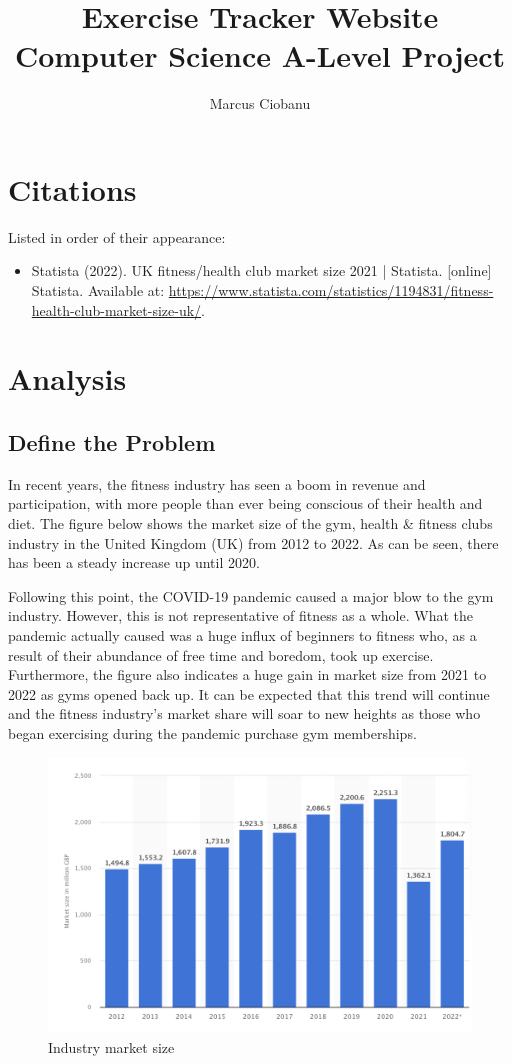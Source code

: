 \documentclass{article}
\title{Exercise Tracker Website \\ \vspace{10pt} \large Computer Science A-Level Project \normalsize}
\author{Marcus Ciobanu}
\date{}
\begin{document}
\maketitle
\newpage

\tableofcontents
\newpage

\section{Citations}
Listed in order of their appearance:
\begin{itemize}
  \item Statista (2022). UK fitness/health club market size 2021 | Statista. [online] Statista. Available at: \url{https://www.statista.com/statistics/1194831/fitness-health-club-market-size-uk/}.
\end{itemize}
\newpage

\section{Analysis}

\subsection{Define the Problem}
In recent years, the fitness industry has seen a boom in revenue and participation, with more people than ever being conscious of their health and diet. The figure below shows the market size of the gym, health \& fitness clubs industry in the United Kingdom (UK) from 2012 to 2022. As can be seen, there has been a steady increase up until 2020. 

Following this point, the COVID-19 pandemic caused a major blow to the gym industry. However, this is not representative of fitness as a whole. What the pandemic actually caused was a huge influx of beginners to fitness who, as a result of their abundance of free time and boredom, took up exercise. Furthermore, the figure also indicates a huge gain in market size from 2021 to 2022 as gyms opened back up. It can be expected that this trend will continue and the fitness industry’s market share will soar to new heights as those who began exercising during the pandemic purchase gym memberships.
\begin{figure}[ht]
  \raggedright
  \includegraphics[width=1\textwidth]{Figure 1.png}
  \caption{Industry market size}
  \label{fig:Figure 1}
\end{figure}
\end{document}
